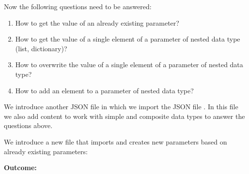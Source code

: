 \vspace{2ex}

Now the following questions need to be answered:

\begin{enumerate}
   \item How to get the value of an already existing parameter?
   \item How to get the value of a single element of a parameter of nested data type (list, dictionary)?
   \item How to overwrite the value of a single element of a parameter of nested data type?
   \item How to add an element to a parameter of nested data type?
\end{enumerate}

We introduce another JSON file  in which we import the JSON file .
In this file we also add content to work with simple and composite data types to answer the questions above.


\newpage

We introduce a new file  that imports  and creates new parameters based on already existing parameters:


\vspace{2ex}

\textbf{Outcome:}

\vspace{2ex}

